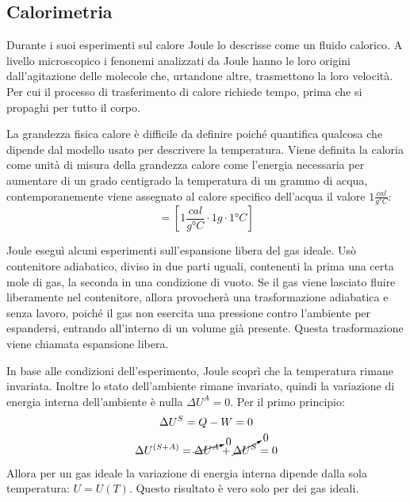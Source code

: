 \documentclass{article}
\numberwithin{equation}{subsection}
\begin{document}
\subsection{Calorimetria}
Durante i suoi esperimenti sul calore Joule lo descrisse come 
un fluido calorico. A livello microscopico i fenonemi 
analizzati da Joule hanno le loro origini dall'agitazione 
delle molecole che, urtandone altre, trasmettono la loro 
velocità. Per cui il processo di trasferimento di calore richiede tempo, prima che si propaghi per tutto il corpo. 



La grandezza fisica calore è difficile da 
definire poiché quantifica qualcosa che dipende dal modello 
usato per descrivere la temperatura. Viene definita la 
caloria come unità di misura della grandezza calore come 
l'energia necessaria per aumentare di un grado centigrado 
la temperatura 
di un grammo di acqua, contemporanemente viene assegnato al 
calore specifico dell'acqua il valore $1\displaystyle\frac{cal}{g\mbox{°}C}$:
\begin{equation}
    [1\:cal]=\left[1\displaystyle\frac{cal}{g\mbox{°}C}\cdot 1g \cdot 1\mbox{°}C\right]
\end{equation}



Joule eseguì alcuni esperimenti sull'espansione libera del gas ideale. Usò contenitore adiabatico, diviso in due parti uguali, contenenti la prima una certa mole di gas, la seconda 
in una condizione di vuoto. Se il gas viene lasciato fluire liberamente nel contenitore, allora provocherà una trasformazione adiabatica 
e senza lavoro, poiché il gas non esercita una pressione contro l'ambiente per espandersi, entrando all'interno di un volume già presente. Questa trasformazione viene chiamata 
espansione libera. 

In base alle condizioni dell'esperimento, Joule scoprì che la temperatura rimane invariata. Inoltre
lo stato dell'ambiente rimane invariato, quindi la variazione 
di energia interna dell'ambiente è nulla $\Delta U^A=0$. Per 
il primo principio: 
\begin{gather*}
    \Delta U^S=Q-W=0\\
    \Delta U^{(S+A)}=\cancelto{0}{\Delta U^A}+\cancelto{0}{\Delta U^S}=0
\end{gather*}
Allora per un gas ideale la variazione di energia 
interna dipende dalla sola temperatura: $U=U(T)$. Questo risultato è vero solo per dei gas ideali. 
\end{document}

